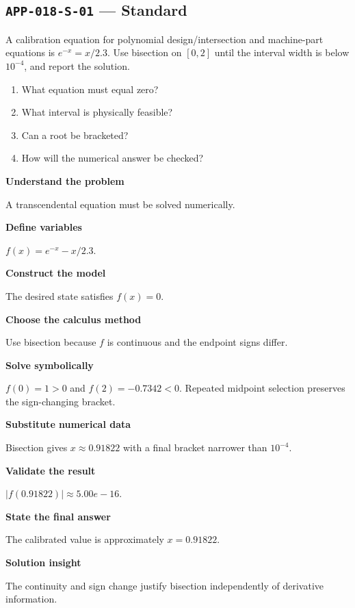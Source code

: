 \documentclass[11pt]{book}
\newcommand{\pid}[1]{\texttt{#1}}
\begin{document}
\subsection*{\pid{APP-018-S-01} — Standard}
\begin{problembox}
A calibration equation for polynomial design/intersection and machine-part equations is $e^{-x}=x/2.3$. Use bisection on $[0,2]$ until the interval width is below $10^{-4}$, and report the solution.
\end{problembox}
\begin{promptbox}\begin{enumerate}
\item What equation must equal zero?
\item What interval is physically feasible?
\item Can a root be bracketed?
\item How will the numerical answer be checked?
\end{enumerate}\end{promptbox}
\begin{solutionbox}
\textbf{Understand the problem}\par A transcendental equation must be solved numerically.\par\medskip
\textbf{Define variables}\par $f(x)=e^{-x}-x/2.3$.\par\medskip
\textbf{Construct the model}\par The desired state satisfies $f(x)=0$.\par\medskip
\textbf{Choose the calculus method}\par Use bisection because $f$ is continuous and the endpoint signs differ.\par\medskip
\textbf{Solve symbolically}\par $f(0)=1>0$ and $f(2)=-0.7342<0$. Repeated midpoint selection preserves the sign-changing bracket.\par\medskip
\textbf{Substitute numerical data}\par Bisection gives $x\approx 0.91822$ with a final bracket narrower than $10^{-4}$.\par\medskip
\textbf{Validate the result}\par $|f(0.91822)|\approx 5.00e-16$.\par\medskip
\textbf{State the final answer}\par The calibrated value is approximately $x=0.91822$.\par\medskip
\textbf{Solution insight}\par The continuity and sign change justify bisection independently of derivative information.\par\medskip
\end{solutionbox}
\end{document}
